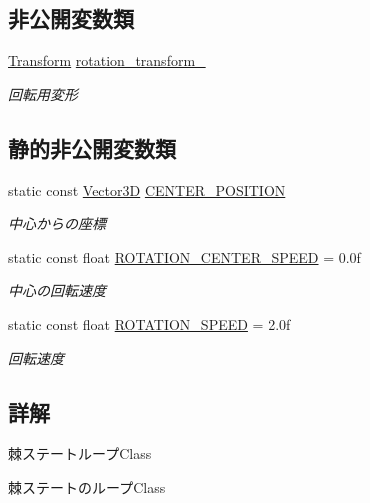 \subsection*{非公開変数類}
\begin{DoxyCompactItemize}
\item 
\mbox{\hyperlink{class_transform}{Transform}} \mbox{\hyperlink{class_needle_state___loop_adbc09dcbbc7367754c5c14aa4ded7497}{rotation\+\_\+transform\+\_\+}}
\begin{DoxyCompactList}\small\item\em 回転用変形 \end{DoxyCompactList}\end{DoxyCompactItemize}
\subsection*{静的非公開変数類}
\begin{DoxyCompactItemize}
\item 
static const \mbox{\hyperlink{class_vector3_d}{Vector3D}} \mbox{\hyperlink{class_needle_state___loop_a742827e05002a4efb72381f410a5ef8c}{C\+E\+N\+T\+E\+R\+\_\+\+P\+O\+S\+I\+T\+I\+ON}}
\begin{DoxyCompactList}\small\item\em 中心からの座標 \end{DoxyCompactList}\item 
static const float \mbox{\hyperlink{class_needle_state___loop_a5b9359b2bdb87d3a83a14387cc21fc23}{R\+O\+T\+A\+T\+I\+O\+N\+\_\+\+C\+E\+N\+T\+E\+R\+\_\+\+S\+P\+E\+ED}} = 0.\+0f
\begin{DoxyCompactList}\small\item\em 中心の回転速度 \end{DoxyCompactList}\item 
static const float \mbox{\hyperlink{class_needle_state___loop_ab427c1fce0c2fb48cbfe6bdb6968b8cc}{R\+O\+T\+A\+T\+I\+O\+N\+\_\+\+S\+P\+E\+ED}} = 2.\+0f
\begin{DoxyCompactList}\small\item\em 回転速度 \end{DoxyCompactList}\end{DoxyCompactItemize}


\subsection{詳解}
棘ステートループ\+Class 

棘ステートのループ\+Class 


